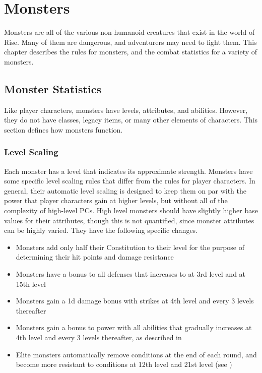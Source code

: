 \chapter{Monsters}

Monsters are all of the various non-humanoid creatures that exist in the world of Rise.
Many of them are dangerous, and adventurers may need to fight them.
This chapter describes the rules for monsters, and the combat statistics for a variety of monsters.

\section{Monster Statistics}
    Like player characters, monsters have levels, attributes, and abilities.
    However, they do not have classes, legacy items, or many other elements of characters.
    This section defines how monsters function.

    \subsection{Level Scaling}
        Each monster has a level that indicates its approximate strength.
        Monsters have some specific level scaling rules that differ from the rules for player characters.
        In general, their automatic level scaling is designed to keep them on par with the power that player characters gain at higher levels, but without all of the complexity of high-level PCs.
        High level monsters should have slightly higher base values for their attributes, though this is not quantified, since monster attributes can be highly varied.
        They have the following specific changes.
        \begin{itemize}
            \item Monsters add only half their Constitution to their level for the purpose of determining their hit points and damage resistance
            \item Monsters have a  bonus to all defenses that increases to  at 3rd level and  at 15th level
            \item Monsters gain a \plus1d damage bonus with strikes at 4th level and every 3 levels thereafter
            \item Monsters gain a  bonus to power with all abilities that gradually increases at 4th level and every 3 levels thereafter, as described in 
            \item Elite monsters automatically remove conditions at the end of each round, and become more resistant to conditions at 12th level and 21st level (see )
        \end{itemize}

